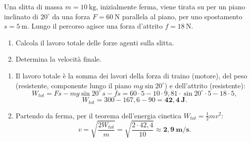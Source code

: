 \begin{question}[ID=2.4, subtitle={Slitta su piano inclinato con attrito e forza di traino}, tags={forze vive, energia, attrito}, difficulty=media]
Una slitta di massa $m = 10\ \text{kg}$, inizialmente ferma, viene tirata su per un piano inclinato di $20^\circ$ da una forza $F = 60\ \text{N}$ parallela al piano, per uno spostamento $s = 5\ \text{m}$. Lungo il percorso agisce una forza d'attrito $f = 18\ \text{N}$.
\begin{enumerate}
    \item Calcola il lavoro totale delle forze agenti sulla slitta.
    \item Determina la velocità finale.
\end{enumerate}
\begin{solution}
\begin{enumerate}
    \item Il lavoro totale è la somma dei lavori della forza di traino (motore), del peso (resistente, componente lungo il piano $mg\sin 20^\circ$) e dell'attrito (resistente):
    \[
    W_{tot} = Fs - mg\sin 20^\circ\, s - f s = 60\cdot 5 - 10\cdot 9{,}81\cdot\sin 20^\circ\cdot 5 - 18\cdot 5,
    \]
    \[
    W_{tot} = 300 - 167{,}6 - 90 = \mathbf{42{,}4\ \text{J}}.
    \]
    \item Partendo da ferma, per il teorema dell'energia cinetica $W_{tot} = \tfrac{1}{2}mv^2$:
    \[
    v = \sqrt{\frac{2W_{tot}}{m}} = \sqrt{\frac{2\cdot 42{,}4}{10}} \approx \mathbf{2{,}9\ \text{m/s}}.
    \]
\end{enumerate}
\end{solution}
\end{question}


